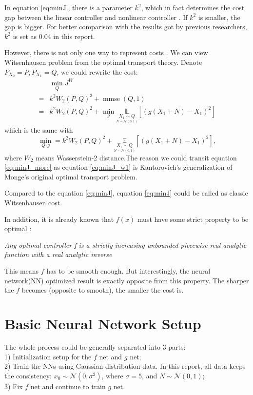 \documentclass[conference,compsoc]{IEEEtran}
\begin{document}
In equation \eqref{eq:minJ}, there is a parameter $k^2$, which in fact determines the cost gap between the linear controller and nonlinear controller \cite{baglietto2001numerical}. If $k^2$ is smaller, the gap is bigger. For better comparison with the results got by previous researchers, $k^2$ is set as 0.04 in this report.

However, there is not only one way to represent costs \cite{wu2011witsenhausen}. We can view Witsenhausen problem from the optimal transport theory. Denote $P_{X_0}=P, P_{X_1}=Q$, we could rewrite the cost:
\begin{align}
  &\min_{Q}J^{W} \nonumber\\
  =&k^{2}W_2(P,Q)^{2}+\operatorname{mmse}(Q,1) \label{eq:minJ_w1} \\
  =&k^{2}W_2(P,Q)^{2}+\min_{g}\underset{ \underset{N \sim \mathcal{N}(0,1)}{X_1\sim Q} }{\mathbb{E}}[(g(X_1+N)-X_1)^2]
\end{align}
which is the same with
\begin{equation}\label{eq:Jw2}
\min_{Q,g}=k^{2}W_2(P,Q)^{2}+\underset{ \underset{N \sim \mathcal{N}(0,1)}{X_1\sim Q} }{\mathbb{E}}[(g(X_1+N)-X_1)^2],
\end{equation}
where $W_2$ means Wasserstein-2 distance.The reason we could transit equation \eqref{eq:minJ_more} as equation \eqref{eq:minJ_w1} is Kantorovich's generalization of Monge's original optimal transport problem.

Compared to the equation \eqref{eq:minJ}, equation \eqref{eq:minJ} could be called as classic Witsenhausen cost. 

In addition, it is already known that $f(x)$ must have some strict property to be optimal \cite{wu2011witsenhausen} :
\begin{adjustwidth}{0.5cm}{}
\textbullet \quad \textit{Any optimal controller f is a strictly increasing unbounded piecewise real analytic function with a real analytic inverse}
\end{adjustwidth}

This means $f$ has to be smooth enough. But interestingly, the neural network(NN) optimized result is exactly opposite from this property. The sharper the $f$ becomes (opposite to smooth), the smaller the cost is.

\section{Basic Neural Network Setup}
The whole process could be generally separated into 3 parts:\\
1) Initialization setup for the $f$ net and $g$ net;\\
2) Train the NNs using Gaussian distribution data. In this report, all data keeps the consistency: $x_0\sim \mathcal{N} (0,\sigma^2)$, where $\sigma=5$, and $N\sim \mathcal{N} (0,1)$; \\
3) Fix $f$ net and continue to train $g$ net.
\end{document}
